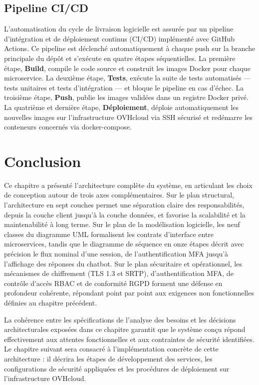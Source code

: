 \subsection{Pipeline CI/CD}
L'automatisation du cycle de livraison logicielle est assurée par un pipeline d'intégration et de déploiement continus (CI/CD) implémenté avec GitHub Actions. Ce pipeline est déclenché automatiquement à chaque push sur la branche principale du dépôt et s'exécute en quatre étapes séquentielles. La première étape, \textbf{Build}, compile le code source et construit les images Docker pour chaque microservice. La deuxième étape, \textbf{Tests}, exécute la suite de tests automatisés — tests unitaires et tests d'intégration — et bloque le pipeline en cas d'échec. La troisième étape, \textbf{Push}, publie les images validées dans un registre Docker privé. La quatrième et dernière étape, \textbf{Déploiement}, déploie automatiquement les nouvelles images sur l'infrastructure OVHcloud via SSH sécurisé et redémarre les conteneurs concernés via docker-compose.

\section*{Conclusion}
Ce chapitre a présenté l'architecture complète du système, en articulant les choix de conception autour de trois axes complémentaires. Sur le plan structural, l'architecture en sept couches permet une séparation claire des responsabilités, depuis la couche client jusqu'à la couche données, et favorise la scalabilité et la maintenabilité à long terme. Sur le plan de la modélisation logicielle, les neuf classes du diagramme UML formalisent les contrats d'interface entre microservices, tandis que le diagramme de séquence en onze étapes décrit avec précision le flux nominal d'une session, de l'authentification MFA jusqu'à l'affichage des réponses du chatbot. Sur le plan sécuritaire et opérationnel, les mécanismes de chiffrement (TLS 1.3 et SRTP), d'authentification MFA, de contrôle d'accès RBAC et de conformité RGPD forment une défense en profondeur cohérente, répondant point par point aux exigences non fonctionnelles définies au chapitre précédent.

La cohérence entre les spécifications de l'analyse des besoins et les décisions architecturales exposées dans ce chapitre garantit que le système conçu répond effectivement aux attentes fonctionnelles et aux contraintes de sécurité identifiées. Le chapitre suivant sera consacré à l'implémentation concrète de cette architecture : il décrira les étapes de développement des services, les configurations de sécurité appliquées et les procédures de déploiement sur l'infrastructure OVHcloud.
